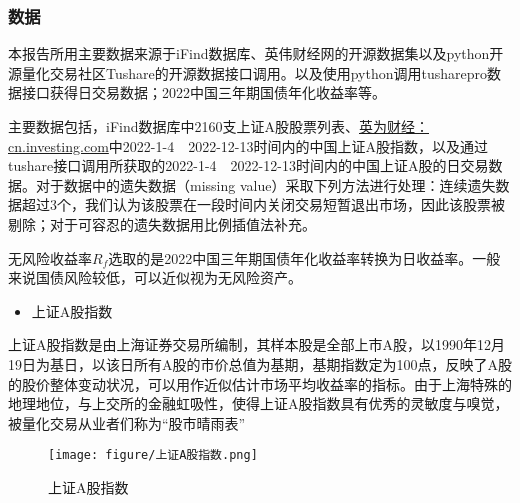 \documentclass{xjtureport}
\begin{document}
\subsubsection{数据}
本报告所用主要数据来源于iFind数据库、英伟财经网的开源数据集以及python开源量化交易社区Tushare的开源数据接口调用。以及使用python调用tusharepro\cite{ref4}数据接口获得日交易数据；2022中国三年期国债年化收益率\cite{ref5}等。
\par 主要数据包括，iFind数据库中2160支上证A股股票列表、\href{https://cn.investing.com/}{英为财经：cn.investing.com}中2022-1-4~~2022-12-13时间内的中国上证A股指数，以及通过tushare接口调用所获取的2022-1-4~~2022-12-13时间内的中国上证A股的日交易数据。对于数据中的遗失数据（missing value）采取下列方法进行处理：连续遗失数据超过3个，我们认为该股票在一段时间内关闭交易短暂退出市场，因此该股票被剔除；对于可容忍的遗失数据用比例插值法补充。
\par 无风险收益率$R_f$选取的是2022中国三年期国债年化收益率\cite{ref5}转换为日收益率。一般来说国债风险较低，可以近似视为无风险资产。
\begin{itemize}
    \item 上证A股指数
\end{itemize}
\par 上证A股指数是由上海证券交易所编制，其样本股是全部上市A股，以1990年12月19日为基日，以该日所有A股的市价总值为基期，基期指数定为100点，反映了A股的股价整体变动状况，可以用作近似估计市场平均收益率的指标。由于上海特殊的地理地位，与上交所的金融虹吸性，使得上证A股指数具有优秀的灵敏度与嗅觉，被量化交易从业者们称为“股市晴雨表”\cite{ref6}
\begin{figure}
    \begin{center}
        \texttt{[image: figure/上证A股指数.png]}
    \end{center}
    \caption{上证A股指数}
\end{figure}
\end{document}
